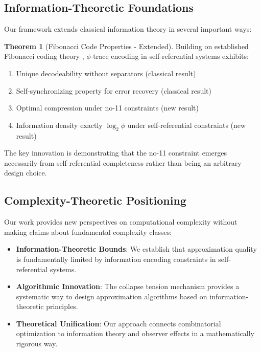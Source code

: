 \documentclass[11pt]{article}
\theoremstyle{remark}
\theoremstyle{definition}
\newtheorem{theorem}{Theorem}
\begin{document}
\subsection{Information-Theoretic Foundations}

Our framework extends classical information theory in several important ways:

\begin{theorem}[Fibonacci Code Properties - Extended]
Building on established Fibonacci coding theory \cite{cover2006elements,fraenkel1985systems}, $\phi$-trace encoding in self-referential systems exhibits:
\begin{enumerate}
\item Unique decodeability without separators (classical result)
\item Self-synchronizing property for error recovery (classical result)  
\item Optimal compression under no-11 constraints (new result)
\item Information density exactly $\log_2 \phi$ under self-referential constraints (new result)
\end{enumerate}
\end{theorem}

The key innovation is demonstrating that the no-11 constraint emerges necessarily from self-referential completeness rather than being an arbitrary design choice.

\subsection{Complexity-Theoretic Positioning}

Our work provides new perspectives on computational complexity without making claims about fundamental complexity classes:

\begin{itemize}
\item \textbf{Information-Theoretic Bounds}: We establish that approximation quality is fundamentally limited by information encoding constraints in self-referential systems.
\item \textbf{Algorithmic Innovation}: The collapse tension mechanism provides a systematic way to design approximation algorithms based on information-theoretic principles.
\item \textbf{Theoretical Unification}: Our approach connects combinatorial optimization to information theory and observer effects in a mathematically rigorous way.
\end{itemize}
\end{document}
